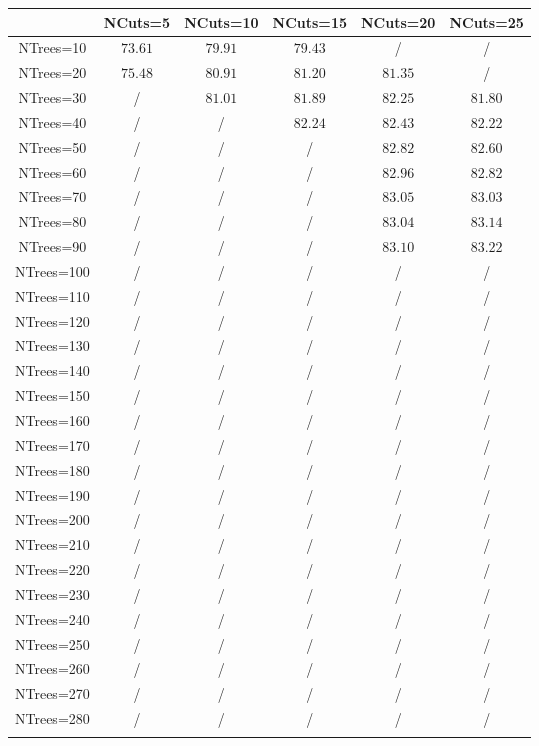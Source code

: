 \centering
\begin{tabular}{cccccc} \toprule\toprule
 & NCuts=5 & NCuts=10 & NCuts=15 & NCuts=20 & NCuts=25\\\midrule
NTrees=10 & $73.61$ & $79.91$ & $79.43$ &  / &  /\\
NTrees=20 & $75.48$ & $80.91$ & $81.20$ & $81.35$ &  /\\
NTrees=30 &  / & $81.01$ & $81.89$ & $82.25$ & $81.80$\\
NTrees=40 &  / &  / & $82.24$ & $82.43$ & $82.22$\\
NTrees=50 &  / &  / &  / & $82.82$ & $82.60$\\
NTrees=60 &  / &  / &  / & $82.96$ & $82.82$\\
NTrees=70 &  / &  / &  / & $83.05$ & $83.03$\\
NTrees=80 &  / &  / &  / & $83.04$ & $83.14$\\
NTrees=90 &  / &  / &  / & $83.10$ & $83.22$\\
NTrees=100 &  / &  / &  / &  / &  /\\
NTrees=110 &  / &  / &  / &  / &  /\\
NTrees=120 &  / &  / &  / &  / &  /\\
NTrees=130 &  / &  / &  / &  / &  /\\
NTrees=140 &  / &  / &  / &  / &  /\\
NTrees=150 &  / &  / &  / &  / &  /\\
NTrees=160 &  / &  / &  / &  / &  /\\
NTrees=170 &  / &  / &  / &  / &  /\\
NTrees=180 &  / &  / &  / &  / &  /\\
NTrees=190 &  / &  / &  / &  / &  /\\
NTrees=200 &  / &  / &  / &  / &  /\\
NTrees=210 &  / &  / &  / &  / &  /\\
NTrees=220 &  / &  / &  / &  / &  /\\
NTrees=230 &  / &  / &  / &  / &  /\\
NTrees=240 &  / &  / &  / &  / &  /\\
NTrees=250 &  / &  / &  / &  / &  /\\
NTrees=260 &  / &  / &  / &  / &  /\\
NTrees=270 &  / &  / &  / &  / &  /\\
NTrees=280 &  / &  / &  / &  / &  /\\
\bottomrule\bottomrule\\
\end{tabular}
